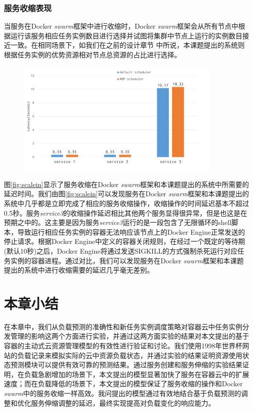 \subsubsection{服务收缩表现}\label{sec:scalein}

当服务在Docker \emph{swarm}框架中进行收缩时，Docker \emph{swarm}框架会从所有节点中根据运行该服务相应任务实例数目进行选择并试图将集群中节点上运行的实例数目接近一致。在相同场景下，如我们在之前的设计章节%
中所说，本课题提出的系统则根据任务实例的优势资源相对节点总资源的占比进行选择。

\begin{figure}[htbp]
\centering
\includegraphics[width=0.9\textwidth]{./figure/scalein}
\end{figure}

图\ref{fig:scalein}显示了服务收缩在Docker \emph{swarm}框架和本课题提出的系统中所需要的延迟时间。我们由图\ref{fig:scalein}可以发现服务在Docker \emph{swarm}框架和本课题提出的系统中几乎都是立即完成了相应的服务收缩操作，收缩操作的时间延迟基本不超过0.5秒。服务\emph{service3}的收缩操作延迟相比其他两个服务显得很异常，但是也这是在预期之中的。这主要是因为服务\emph{service3}运行的是一段包含了无限循环的shell脚本，导致运行相应任务实例的容器无法响应该节点上的Docker Engine正常发送的停止请求。根据Docker Engine中定义的容器关闭规则，在经过一个既定的等待期(默认10秒)之后，Docker Engine将通过发送SIGKILL的方式强制杀死运行对应任务实例的容器进程。通过对比，我们可以发现服务在Docker \emph{swarm}框架和本课题提出的系统中进行收缩需要的延迟几乎毫无差别。

\section{本章小结}
在本章中，我们从负载预测的准确性和新任务实例调度策略对容器云中任务实例分发管理的影响这两个方面进行实验，并通过这两方面实验的结果对本文提出的基于容器的主动式云资源管理模型的有效性进行验证和讨论。我们使用1998年世界杯网站的负载记录来模拟实际的云中资源负载状态，并通过实验的结果证明资源使用状态预测模块可以提供有效可靠的预测结果。通过服务创建和服务伸缩的实验结果证明，在负载急剧增加的场景下，本文提出的模型显著加快了服务在容器云中的扩展速度；而在负载降低的场景下，本文提出的模型保证了服务收缩的操作和Docker \emph{swarm}中的服务收缩一样高效。我问提出的模型通过有效地结合基于负载预测的调整和优化服务伸缩调整的延迟，最终实现提高对负载变化的响应能力。
